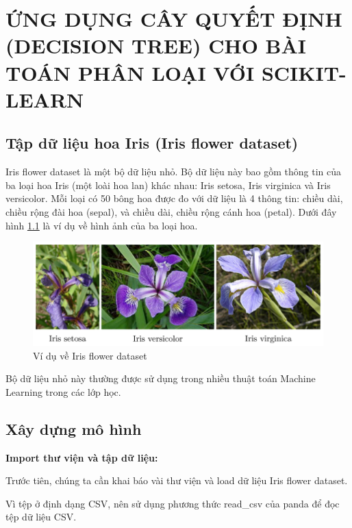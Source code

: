 \chapter{ỨNG DỤNG CÂY QUYẾT ĐỊNH (DECISION TREE) CHO BÀI TOÁN PHÂN LOẠI VỚI SCIKIT-LEARN}

\section{Tập dữ liệu hoa Iris (Iris flower dataset)}
Iris flower dataset là một bộ dữ liệu nhỏ. Bộ dữ liệu này bao gồm thông tin của ba loại hoa Iris (một loài hoa lan) khác nhau: Iris setosa, Iris virginica và Iris versicolor. Mỗi loại có 50 bông hoa được đo với dữ liệu là 4 thông tin: chiều dài, chiều rộng đài hoa (sepal), và chiều dài, chiều rộng cánh hoa (petal). Dưới đây hình \ref{fig:iris} là ví dụ về hình ảnh của ba loại hoa.\newpage

\begin{center}
    \begin{figure}[h!]
        \begin{center}
         \includegraphics[scale=0.7]{chapter7/img/iris.png}
        \end{center}
        \caption{Ví dụ về Iris flower dataset}
        \label{fig:iris}
    \end{figure}
\end{center}

Bộ dữ liệu nhỏ này thường được sử dụng trong nhiều thuật toán Machine Learning trong các lớp học.

\section{Xây dựng mô hình}
\textbf{Import thư viện và tập dữ liệu:}

Trước tiên, chúng ta cần khai báo vài thư viện và load dữ liệu Iris flower dataset.

Vì tệp ở định dạng CSV, nên sử dụng phương thức read\_csv của panda để đọc tệp dữ liệu CSV.


